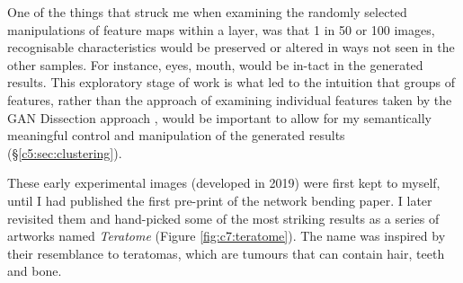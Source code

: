 One of the things that struck me when examining the randomly selected manipulations of feature maps within a layer, was that 1 in 50 or 100 images, recognisable characteristics would be preserved or altered in ways not seen in the other samples. 
For instance, eyes, mouth, would be in-tact in the generated results. This exploratory stage of work is what led to the intuition that groups of features, rather than the approach of examining individual features taken by the GAN Dissection approach \citep{bau2019semantic}, would be important to allow for my semantically meaningful control and manipulation of the generated results (\S \ref{c5:sec:clustering}). 

These early experimental images (developed in 2019) were first kept to myself, until I had published the first pre-print of the network bending paper.
I later revisited them and hand-picked some of the most striking results as a series of artworks named \textit{Teratome} \citeyearpar{broad2020teratome} (Figure \ref{fig:c7:teratome}). 
The name was inspired by their resemblance to teratomas, which are tumours that can contain hair, teeth and bone. 

